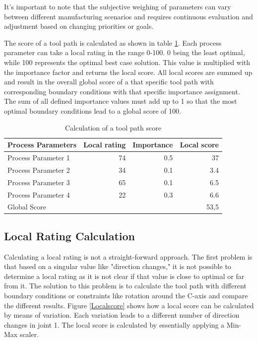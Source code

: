 It's important to note that the subjective weighing of parameters can vary between different manufacturing scenarios and requires continuous evaluation and adjustment based on changing priorities or goals.

The score of a tool path is calculated as shown in table \ref{weighting}. Each process parameter can take a local rating in the range 0-100. 0 being the least optimal, while 100 represents the optimal best case solution. This value is multiplied with the importance factor and returns the local score. 
All local scores are summed up and result in the overall global score of a that specific tool path with corresponding boundary conditions with that specific importance assignment.
The sum of all defined importance values must add up to 1 so that the most optimal boundary conditions lead to a global score of 100.


\begin{table}[H]
	\centering
	\begin{tabular}{||l|r|r|r||}
		Process Parameters & Local rating & Importance & Local score\\
		\hline
		\hline
		\hline
		
		Process Parameter 1 & 74 & 0.5 & 37\\
		Process Parameter 2 & 34& 0.1&3.4\\
		Process Parameter 3& 65& 0.1&6.5\\
		Process Parameter 4& 22&0.3&6.6\\
		\hline
		\hline
		\hline
		Global Score& & &53,5\\
		\hline
		\hline
	\end{tabular}
	
	\caption{Calculation of a tool path score}
	\label{weighting}
\end{table}


\subsection{Local Rating Calculation}\label{LRC}
Calculating a local rating is not a straight-forward approach. The first problem is that based on a singular value like "direction changes," it is not possible to determine a local rating as it is not clear if that value is close to optimal or far from it.
The solution to this problem is to calculate the tool path with different boundary conditions or constraints like rotation around the C-axis and compare the different results.
Figure \ref{Localscore} shows how a local score can be calculated by means of variation. Each variation leads to a different number of direction changes in joint 1. The local score is calculated by essentially applying a Min-Max scaler.

